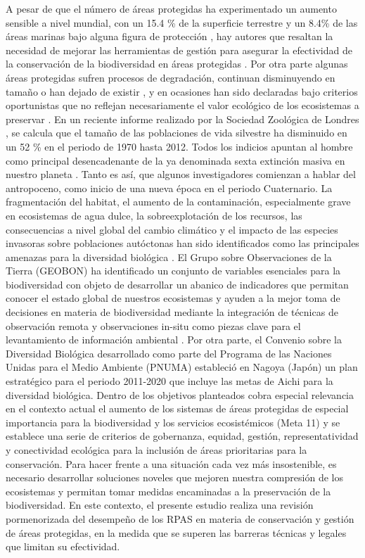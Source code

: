 \documentclass[9t,twocolumn]{article}
\begin{document}
A pesar de que el número de áreas protegidas ha experimentado un aumento
sensible a nivel mundial, con un 15.4 \% de la superficie terrestre y un
8.4\% de las áreas marinas bajo alguna figura de protección
\citep{juffe2014protected} , hay autores que resaltan la necesidad de
mejorar las herramientas de gestión para asegurar la efectividad de la
conservación de la biodiversidad en áreas protegidas \citep{Chape2005}.
Por otra parte algunas áreas protegidas sufren procesos de degradación,
continuan disminuyendo en tamaño o han dejado de existir
\citep{Mascia2011}, y en ocasiones han sido declaradas bajo criterios
oportunistas que no reflejan necesariamente el valor ecológico de los
ecosistemas a preservar \citep{Knight2007}. En un reciente informe
realizado por la Sociedad Zoológica de Londres \citep{Living2016} , se
calcula que el tamaño de las poblaciones de vida silvestre ha disminuido
en un 52 \% en el periodo de 1970 hasta 2012. Todos los indicios apuntan
al hombre como principal desencadenante de la ya denominada sexta
extinción masiva en nuestro planeta \citep{Barnosky2011}. Tanto es así,
que algunos investigadores comienzan a hablar del antropoceno, como
inicio de una nueva época en el periodo Cuaternario. La fragmentación
del habitat, el aumento de la contaminación, especialmente grave en
ecosistemas de agua dulce, la sobreexplotación de los recursos, las
consecuencias a nivel global del cambio climático y el impacto de las
especies invasoras sobre poblaciones autóctonas han sido identificados
como las principales amenazas para la diversidad biológica . El Grupo
sobre Observaciones de la Tierra (GEOBON) ha identificado un conjunto de
variables esenciales para la biodiversidad \citep{Pereira2013} con
objeto de desarrollar un abanico de indicadores que permitan conocer el
estado global de nuestros ecosistemas y ayuden a la mejor toma de
decisiones en materia de biodiversidad mediante la integración de
técnicas de observación remota y observaciones in-situ como piezas clave
para el levantamiento de información ambiental \citep{Forum2008}. Por
otra parte, el Convenio sobre la Diversidad Biológica desarrollado como
parte del Programa de las Naciones Unidas para el Medio Ambiente (PNUMA)
estableció en Nagoya (Japón) un plan estratégico para el periodo
2011-2020 que incluye las metas de Aichi para la diversidad biológica.
Dentro de los objetivos planteados cobra especial relevancia en el
contexto actual el aumento de los sistemas de áreas protegidas de
especial importancia para la biodiversidad y los servicios ecosistémicos
(Meta 11) y se establece una serie de criterios de gobernanza, equidad,
gestión, representatividad y conectividad ecológica para la inclusión de
áreas prioritarias para la conservación. Para hacer frente a una
situación cada vez más insostenible, es necesario desarrollar soluciones
noveles que mejoren nuestra compresión de los ecosistemas y permitan
tomar medidas encaminadas a la preservación de la biodiversidad. En este
contexto, el presente estudio realiza una revisión pormenorizada del
desempeño de los RPAS en materia de conservación y gestión de áreas
protegidas, en la medida que se superen las barreras técnicas y legales
que limitan su efectividad.
\end{document}
